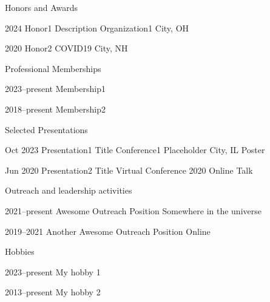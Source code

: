 \documentclass[letterpaper,11pt,twoside]{drevoresumecv}
\begin{document}

\begin{cvsection}{Honors and Awards}

  \cvhonors
    {2024}
    {Honor1}
    {Description}
    {Organization1}
    {City, OH}

  \cvhonors
    {2020}
    {Honor2}
    {} %
    {COVID19}
    {City, NH}
\end{cvsection}


\begin{cvsection}{Professional Memberships}

  \cvmembership
    {2023--present}
    {Membership1}

  \cvmembership
    {2018--present}
    {Membership2}
\end{cvsection}



\begin{cvsection}{Selected Presentations}

  \cvtalk
    {Oct 2023}
    {Presentation1 Title}
    {Conference1}
    {Placeholder City, IL}
    {Poster}

  \cvtalk 
    {Jun 2020}
    {Presentation2 Title}
    {Virtual Conference 2020}
    {Online} 
    {Talk}
\end{cvsection}

\begin{cvsection}{Outreach and leadership activities} 

  \cvoutreach
    {2021--present}
    {Awesome Outreach Position}
    {Somewhere in the universe}
    {
    }

  \cvoutreach
    {2019--2021}
    {Another Awesome Outreach Position}
    {Online}
    {
    }
\end{cvsection}


\begin{cvsection}{Hobbies}

  \cvhobby
    {2023--present}
    {My hobby 1}
    {
    }

  \cvhobby
    {2013--present}
    {My hobby 2}
    {
    }
\end{cvsection}
\end{document}
